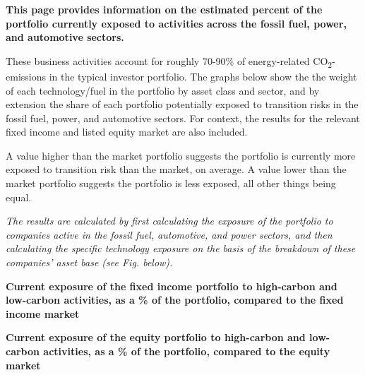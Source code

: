 \documentclass[10pt,table,a4]{article}\usepackage[]{graphicx}\usepackage[]{color}
\begin{document}
	\begin{multicols}{2}

		\textbf{This page provides information on the estimated percent of the portfolio currently exposed to activities across the fossil fuel, power, and automotive sectors. }
		
		These business activities account for roughly 70-90\% of energy-related CO\textsubscript{2}-emissions in the typical investor portfolio. The graphs below show the the weight of each technology/fuel in the portfolio by asset class and sector, and by extension the share of each portfolio potentially exposed to transition risks in the fossil fuel, power, and automotive sectors. For context, the results for the relevant fixed income and listed equity market are also included.
		
		A value higher than the market portfolio suggests the portfolio is currently more exposed to transition risk than the market, on average. A value lower than the market portfolio suggests the portfolio is less exposed, all other things being equal. 

		\textit{The results are calculated by first calculating the exposure of the portfolio to companies active in the fossil fuel, automotive, and power sectors, and then calculating the specific technology exposure on the basis of the breakdown of these companies' asset base (see Fig. below). }
		
		\vspace{-0.1cm}
		
	\end{multicols}
	
	\vspace{-0.7cm}
	
	\textbf{Current exposure of the fixed income portfolio to high-carbon and low-carbon activities, as a \% of the portfolio, compared to the fixed income market} 
	
	\vspace{-0.2cm}
	
	
	
	
	\textbf{Current exposure of the equity portfolio to high-carbon and low-carbon activities, as a \% of the portfolio, compared to the equity market}
	
	\vspace{-0.2cm}
	
\end{document}

